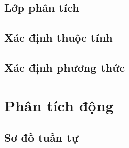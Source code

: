 \documentclass[12pt]{article}
\begin{document}
  \subsection{Lớp phân tích}

  \subsection{Xác định thuộc tính}

  \subsection{Xác định phương thức}

\section{Phân tích động}

  \subsection{Sơ đồ tuần tự}

\begin{thebibliography}{9}
\end{thebibliography}
\end{document}
